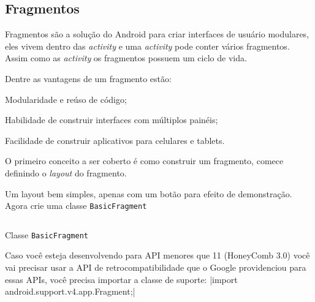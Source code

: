 \documentclass[a4paper,12pt,brazil,oneside]{book}
\begin{document}
\begin{singlespace}
\section{Fragmentos}
\label{sec:frags}

Fragmentos são a solução do Android para criar interfaces de usuário modulares, eles vivem dentro das \emph{activity} e uma \emph{activity} pode conter vários fragmentos. Assim como as \emph{activity} os fragmentos possuem um ciclo de vida. %

Dentre as vantagens de um fragmento estão:
\bi
	\item Modularidade e reúso de código;
	\item Habilidade de construir interfaces com múltiplos painéis;
	\item Facilidade de construir aplicativos para celulares e tablets.
\ei

O primeiro conceito a ser coberto é como construir um fragmento, comece definindo o \emph{layout} do fragmento.

Um layout bem simples, apenas com um botão para efeito de demonstração. Agora crie uma classe \texttt{BasicFragment}

\begin{listing}[H]
\inputminted[linenos=true,fontsize=\small,frame=lines, framesep=2mm, tabsize=2,numbersep=5pt]{java}{src/design/basicfragment.java}
\caption{Classe \texttt{BasicFragment}}
\end{listing}	

Caso você esteja desenvolvendo para API menores que 11 (HoneyComb 3.0) você vai precisar usar a API de retrocompatibilidade que o Google providenciou para essas APIs, você precisa importar a classe de suporte: |import android.support.v4.app.Fragment;|




\end{singlespace}
\end{document}
